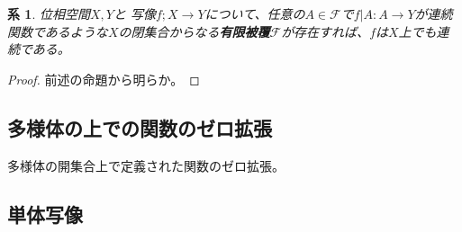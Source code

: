 \documentclass[leqno]{jsarticle}
\newtheorem{cor}[thm]{系}
\begin{document}
\begin{cor}
位相空間$X,Y$と
写像$f;X\to Y$について、任意の$A\in \mathcal{F}$で$f|A:A\to Y$が連続関数であるような$X$の閉集合からなる{\bf 有限被覆}$\mathcal{F}$が存在すれば、$f$は$X$上でも連続である。
\end{cor}
\begin{proof}
前述の命題から明らか。
\end{proof}


\subsection{多様体の上での関数のゼロ拡張}
多様体の開集合上で定義された関数のゼロ拡張。


\subsection{単体写像}



























			
\end{document}
